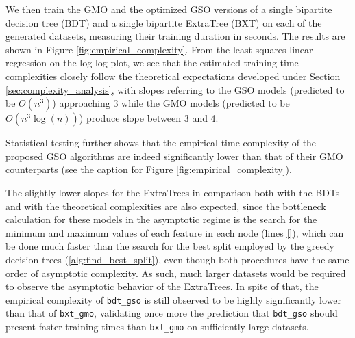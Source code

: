 We then train the GMO and the optimized GSO versions of a single bipartite decision tree (BDT) and a single bipartite ExtraTree (BXT) on each of the generated datasets, measuring their training duration in seconds. The results are shown in Figure \ref{fig:empirical_complexity}. From the least squares linear regression on the log-log plot, we see that the estimated training time complexities closely follow the theoretical expectations developed under Section \ref{sec:complexity_analysis}, with slopes referring to the GSO models (predicted to be $O(n^3)$) approaching 3 while the GMO models (predicted to be $O(n^3\log(n))$) produce slope between 3 and 4.

Statistical testing further shows that the empirical time complexity of the proposed GSO algorithms are indeed significantly lower than that of their GMO counterparts (see the caption for Figure \ref{fig:empirical_complexity}).


The slightly lower slopes for the ExtraTrees in comparison both with the BDTs and with the theoretical complexities are also expected, since the bottleneck calculation for these models in the asymptotic regime is the search for the minimum and maximum values of each feature in each node (lines \ref{}), which can be done much faster than the search for the best split employed by the greedy decision trees (\autoref{alg:find_best_split}), even though both procedures have the same order of asymptotic complexity. As such, much larger datasets would be required to observe the asymptotic behavior of the ExtraTrees.
In spite of that, the empirical complexity of \texttt{bdt\_gso} is still observed to be highly significantly lower than that of \texttt{bxt\_gmo}, validating once more the prediction that \texttt{bdt\_gso} should present faster training times than \texttt{bxt\_gmo} on sufficiently large datasets.

